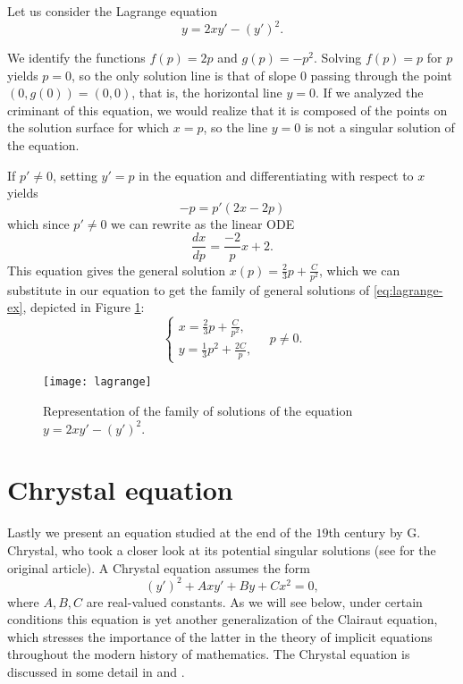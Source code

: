\begin{example} Let us consider the Lagrange equation
  \begin{equation}\label{eq:lagrange-ex}
    y=2xy'-(y')^2.
  \end{equation}

We identify the functions $f(p)=2p$ and $g(p)=-p^2$. Solving $f(p)=p$ for $p$ yields $p=0$, so the only solution line is that of slope $0$ passing through the point $(0,g(0))=(0,0)$, that is, the horizontal line $y=0$. If we analyzed the criminant of this equation, we would realize that it is composed of the points on the solution surface for which $x=p$, so the line $y=0$ is not a singular solution of the equation.

If $p'\neq 0$, setting $y'=p$ in the equation and differentiating with respect to $x$ yields
\[
-p=p'(2x-2p)
\]
which since $p'\neq 0$ we can rewrite as the linear ODE
\[
\frac{dx}{dp}= \frac{-2}{p}x + 2.
\]
This equation gives the general solution $x(p)=\frac{2}{3}p+\frac{C}{p^2}$, which we can substitute in our equation to get the family of general solutions of \eqref{eq:lagrange-ex}, depicted in Figure \ref{fig:lagrange}:
\[
\begin{cases}
  \displaystyle x=\frac{2}{3}p+\frac{C}{p^2},\\
  \displaystyle y=\frac{1}{3}p^2+\frac{2C}{p},
\end{cases}\quad p \neq 0.
\]

\begin{figure}[h!]
\centering
\texttt{[image: lagrange]}
\caption{Representation of the family of solutions of the equation $y=2xy'-(y')^2$.}
\label{fig:lagrange}
\end{figure}

\end{example}

\section{Chrystal equation}

Lastly we present an equation studied at the end of the $19$th century by G. Chrystal, who took a closer look at its potential singular solutions (see \cite{chrystal1897discriminant} for the original article). A Chrystal equation assumes the form
\begin{equation} \label{eq:chrystal}
  (y')^2 + Axy' + By + Cx^2=0,
\end{equation}
where $A,B,C$ are real-valued constants. As we will see below, under certain conditions this equation is yet another generalization of the Clairaut equation, which stresses the importance of the latter in the theory of implicit equations throughout the modern history of mathematics. The Chrystal equation is discussed in some detail in \cite{ince1956ordinary} and \cite{davis1962introduction}.

